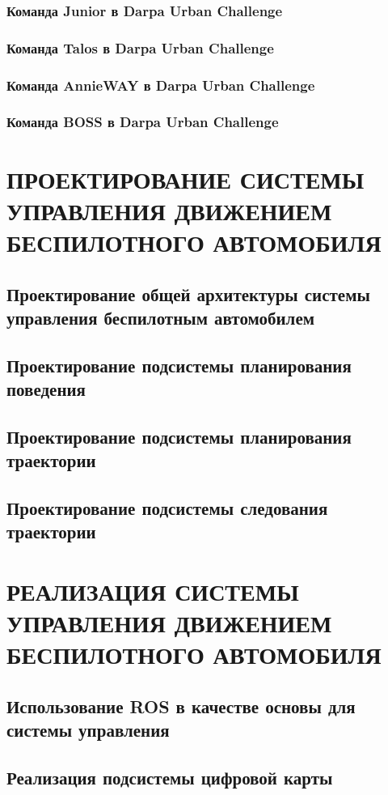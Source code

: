 \subsection{Команда Junior в Darpa Urban Challenge}
\subsection{Команда Talos в Darpa Urban Challenge}
\subsection{Команда AnnieWAY в Darpa Urban Challenge}
\subsection{Команда BOSS в Darpa Urban Challenge}

\chapter{ПРОЕКТИРОВАНИЕ СИСТЕМЫ УПРАВЛЕНИЯ ДВИЖЕНИЕМ БЕСПИЛОТНОГО АВТОМОБИЛЯ}
\section{Проектирование общей архитектуры системы управления беспилотным автомобилем}
\section{Проектирование подсистемы планирования поведения}
\section{Проектирование подсистемы планирования траектории}
\section{Проектирование подсистемы следования траектории}

\chapter{РЕАЛИЗАЦИЯ СИСТЕМЫ УПРАВЛЕНИЯ ДВИЖЕНИЕМ БЕСПИЛОТНОГО АВТОМОБИЛЯ}
\section{Использование ROS в качестве основы для системы управления}
\section{Реализация подсистемы цифровой карты}
